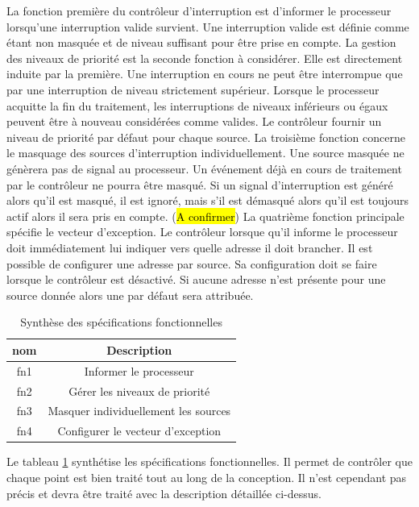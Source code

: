 La fonction première du contrôleur d'interruption est d'informer le processeur lorsqu'une interruption valide survient.
Une interruption valide est définie comme étant non masquée et de niveau suffisant pour être prise en compte.
La gestion des niveaux de priorité est la seconde fonction à considérer. 
Elle est directement induite par la première.
Une interruption en cours ne peut être interrompue que par une interruption de niveau strictement supérieur.
Lorsque le processeur acquitte la fin du traitement, les interruptions de niveaux inférieurs ou égaux peuvent être à nouveau considérées comme valides. 
Le contrôleur fournir un niveau de priorité par défaut pour chaque source.
La troisième fonction concerne le masquage des sources d'interruption individuellement.
Une source masquée ne génèrera pas de signal au processeur.
Un événement déjà en cours de traitement par le contrôleur ne pourra être masqué. %
Si un signal d'interruption est généré alors qu'il est masqué, il est ignoré, mais s'il est démasqué alors qu'il est toujours actif alors il sera pris en compte. (\hl{A confirmer})
La quatrième fonction principale spécifie le vecteur d'exception.
Le contrôleur lorsque qu'il informe le processeur doit immédiatement lui indiquer vers quelle adresse il doit brancher.
Il est possible de configurer une adresse par source.
Sa configuration doit se faire lorsque le contrôleur est désactivé.
Si aucune adresse n'est présente pour une source donnée alors une par défaut sera attribuée.

\begin{table}[H]
	\centering
	\begin{tabular}{|c|c|}
		\hline
		nom & Description \\ \hline
		fn1 & Informer le processeur \\ \hline
		fn2 & Gérer les niveaux de priorité \\ \hline
		fn3 & Masquer individuellement les sources \\ \hline
		fn4 & Configurer le vecteur d'exception \\ \hline
	\end{tabular}
	\caption{Synthèse des spécifications fonctionnelles}
	\label{tab:spe_funct}
\end{table}

Le tableau \ref{tab:spe_funct} synthétise les spécifications fonctionnelles. 
Il permet de contrôler que chaque point est bien traité tout au long de la conception. 
Il n'est cependant pas précis et devra être traité avec la description détaillée ci-dessus.


